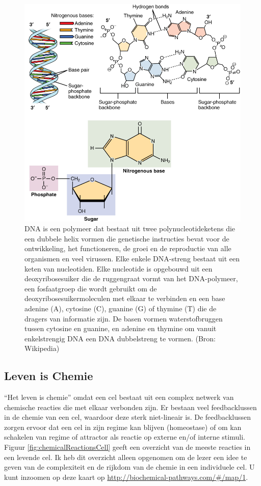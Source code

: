 \documentclass[
  11pt,
]{book}
\begin{document}
\begin{figure}

{\centering \includegraphics[width=0.5\linewidth]{./figs/DNA_Nucleotides} 

}

\caption{DNA is een polymeer dat bestaat uit twee polynucleotideketens die een dubbele helix vormen die genetische instructies bevat voor de ontwikkeling, het functioneren, de groei en de reproductie van alle organismen en veel virussen. Elke enkele DNA-streng bestaat uit een keten van nucleotiden. Elke nucleotide is opgebouwd uit een deoxyribosesuiker die de ruggengraat vormt van het DNA-polymeer, een fosfaatgroep die wordt gebruikt om de deoxyribosesuikermoleculen met elkaar te verbinden en een base adenine (A), cytosine (C), guanine (G) of thymine (T) die de dragers van informatie zijn. De basen vormen waterstofbruggen tussen cytosine en guanine, en adenine en thymine om vanuit enkelstrengig DNA een DNA dubbelstreng te vormen. (Bron: Wikipedia)}\label{fig:DNA}
\end{figure}

\newpage

\hypertarget{lifeChemistry}{%
\subsection{Leven is Chemie}\label{lifeChemistry}}

``Het leven is chemie'' omdat een cel bestaat uit een complex netwerk van chemische reacties die met elkaar verbonden zijn. Er bestaan veel feedbacklussen in de chemie van een cel, waardoor deze sterk niet-lineair is. De feedbacklussen zorgen ervoor dat een cel in zijn regime kan blijven (homeostase) of om kan schakelen van regime of attractor als reactie op externe en/of interne stimuli. Figuur \ref{fig:chemicalReactionsCell} geeft een overzicht van de meeste reacties in een levende cel. Ik heb dit overzicht alleen opgenomen om de lezer een idee te geven van de complexiteit en de rijkdom van de chemie in een individuele cel. U kunt inzoomen op deze kaart op \url{http://biochemical-pathways.com/\#/map/1}.
\end{document}
